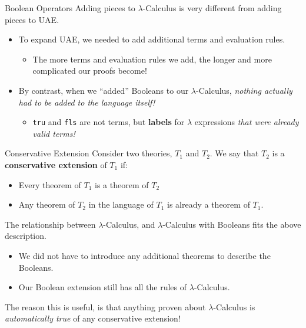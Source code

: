 \documentclass[11pt]{beamer}
\begin{document}
\begin{frame}[fragile=singleslide]{Boolean Operators}
Adding pieces to $\lambda$-Calculus is very different from adding pieces to UAE.   
\begin{itemize}
\item To expand UAE, we needed to add additional terms and evaluation rules. 
\begin{itemize}
\item The more terms and evaluation rules we add, the longer and more complicated our proofs become! 
\end{itemize}
\item By contrast, when we ``added'' Booleans to our $\lambda$-Calculus, \emph{nothing actually had to be added to the language itself!}
\begin{itemize}
\item \texttt{tru} and \texttt{fls} are not terms, but \textbf{labels} for $\lambda$ expressions \emph{that were already valid terms!}
\end{itemize}
\end{itemize}
\end{frame}

\begin{frame}[fragile=singleslide]{Conservative Extension}
Consider two theories, $T_1$ and $T_2$.  We say that $T_2$ is a \textbf{conservative extension} of $T_1$ if:
\begin{itemize}
\item Every theorem of $T_1$ is a theorem of $T_2$
\item Any theorem of $T_2$ in the language of $T_1$ is already a theorem of $T_1$.
\end{itemize}
The relationship between $\lambda$-Calculus, and $\lambda$-Calculus with Booleans fits the above description.
\begin{itemize}
\item We did not have to introduce any additional theorems to describe the Booleans.  
\item Our Boolean extension still has all the rules of $\lambda$-Calculus.
\end{itemize}
The reason this is useful, is that anything proven about $\lambda$-Calculus is \emph{automatically true} of any conservative extension! 
\end{frame}
\end{document}

